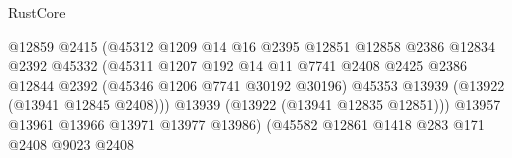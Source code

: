 \begin{lexlean}{RustCore}
\begin{coremodule}
                                                  @12859
                                                  @2415
                                                  (@45312
                                                    @1209
                                                    @14
                                                    @16
                                                    @2395
                                                    @12851
                                                    @12858
                                                    @2386
                                                    @12834
                                                    @2392
                                                    @45332
                                                    (@45311
                                                      @1207
                                                      @192
                                                      @14
                                                      @11
                                                      @7741
                                                      @2408
                                                      @2425
                                                      @2386
                                                      @12844
                                                      @2392
                                                      (@45346 @1206 @7741 @30192 @30196)
                                                      @45353
                                                      @13939
                                                      (@13922 (@13941 @12845 @2408)))
                                                    @13939
                                                    (@13922 (@13941 @12835 @12851)))
                                                  @13957
                                                  @13961
                                                  @13966
                                                  @13971
                                                  @13977
                                                  @13986)
                                                (@45582
                                                  @12861
                                                  @1418
                                                  @283
                                                  @171
                                                  @2408
                                                  @9023
                                                  @2408

\end{coremodule}
\end{lexlean}
